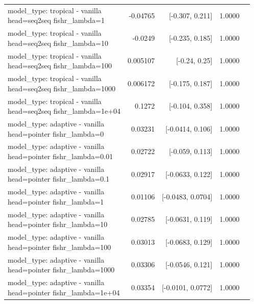 \documentclass[10pt]{article}
\makeatletter
\newcommand{\stackcell}[1]{\begin{tabular}[t]{@{}l@{}}#1\end{tabular}}
\makeatother
\begin{document}
{\begin{longtable}{lrrrl}
\stackcell{model\_type: tropical - vanilla\\\footnotesize head=seq2seq fishr\_lambda=1 } & -0.04765 & [-0.307, 0.211] & 1.0000 & \\
\stackcell{model\_type: tropical - vanilla\\\footnotesize head=seq2seq fishr\_lambda=10 } & -0.0249 & [-0.235, 0.185] & 1.0000 & \\
\stackcell{model\_type: tropical - vanilla\\\footnotesize head=seq2seq fishr\_lambda=100 } & 0.005107 & [-0.24, 0.25] & 1.0000 & \\
\stackcell{model\_type: tropical - vanilla\\\footnotesize head=seq2seq fishr\_lambda=1000 } & 0.006172 & [-0.175, 0.187] & 1.0000 & \\
\stackcell{model\_type: tropical - vanilla\\\footnotesize head=seq2seq fishr\_lambda=1e+04 } & 0.1272 & [-0.104, 0.358] & 1.0000 & \\
\stackcell{model\_type: adaptive - vanilla\\\footnotesize head=pointer fishr\_lambda=0 } & 0.03231 & [-0.0414, 0.106] & 1.0000 & \\
\stackcell{model\_type: adaptive - vanilla\\\footnotesize head=pointer fishr\_lambda=0.01 } & 0.02722 & [-0.059, 0.113] & 1.0000 & \\
\stackcell{model\_type: adaptive - vanilla\\\footnotesize head=pointer fishr\_lambda=0.1 } & 0.02917 & [-0.0633, 0.122] & 1.0000 & \\
\stackcell{model\_type: adaptive - vanilla\\\footnotesize head=pointer fishr\_lambda=1 } & 0.01106 & [-0.0483, 0.0704] & 1.0000 & \\
\stackcell{model\_type: adaptive - vanilla\\\footnotesize head=pointer fishr\_lambda=10 } & 0.02785 & [-0.0631, 0.119] & 1.0000 & \\
\stackcell{model\_type: adaptive - vanilla\\\footnotesize head=pointer fishr\_lambda=100 } & 0.03013 & [-0.0683, 0.129] & 1.0000 & \\
\stackcell{model\_type: adaptive - vanilla\\\footnotesize head=pointer fishr\_lambda=1000 } & 0.03306 & [-0.0546, 0.121] & 1.0000 & \\
\stackcell{model\_type: adaptive - vanilla\\\footnotesize head=pointer fishr\_lambda=1e+04 } & 0.03354 & [-0.0101, 0.0772] & 1.0000 & \\

\end{longtable}}
\end{document}
